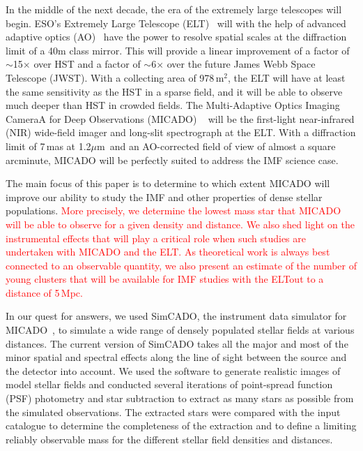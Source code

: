 \documentclass{aa}
\newcommand{\um}{$\mu$m~}
\newcommand{\s}{$\sim$}
\newcommand{\h}[1]{$^{#1}$}
\newcommand{\langedit}[1]{\textcolor{red}{#1}}
\begin{document}
In the middle of the next decade, the era of the extremely large telescopes will begin.
ESO's Extremely Large Telescope (ELT)~\citep{eelt} will with the help of advanced adaptive optics (AO)~\citep{maory} have the power to resolve spatial scales at the diffraction limit of a 40m class mirror.
This will provide a linear improvement of a factor of \s15$\times$ over HST and a factor of \s6$\times$ over the future James Webb Space Telescope (JWST).
With a collecting area of 978\,m\h2, the ELT will have at least the same sensitivity as the HST in a sparse field, and it will be able to observe much deeper than HST in crowded fields.
The Multi-Adaptive Optics Imaging CameraA for Deep Observations (MICADO) ~\citep{micado2016, micado2018} will be the first-light near-infrared (NIR) wide-field imager and long-slit spectrograph at the ELT\@.
With a diffraction limit of 7\,mas at 1.2\um and an AO-corrected field of view of almost a square arcminute, MICADO will be perfectly suited to address the IMF science case.

The main focus of this paper is to determine to which extent MICADO will improve our ability to study the IMF and other properties of dense stellar populations.
\langedit{More precisely, we determine the lowest mass star that MICADO will be able to observe for a given density and distance.
We also shed light on the instrumental effects that will play a critical role when such studies are undertaken with MICADO and the ELT.
As theoretical work is always best connected to an observable quantity, we also present an estimate of the number of young clusters that will be available for IMF studies with the ELT\@ out to a distance of 5\,Mpc.}

In our quest for answers, we used SimCADO, the instrument data simulator for MICADO~\citep{leschinski2016, leschinski19}, to simulate a wide range of densely populated stellar fields at various distances.
The current version of SimCADO takes all the major and most of the minor spatial and spectral effects along the line of sight between the source and the detector into account.
We used the software to generate realistic images of model stellar fields and  conducted several iterations of point-spread function (PSF) photometry and star subtraction to extract as many stars as possible from the simulated observations.
The extracted stars were compared with the input catalogue to determine the completeness of the extraction and to define a limiting reliably observable mass for the different stellar field densities and distances.
\end{document}
